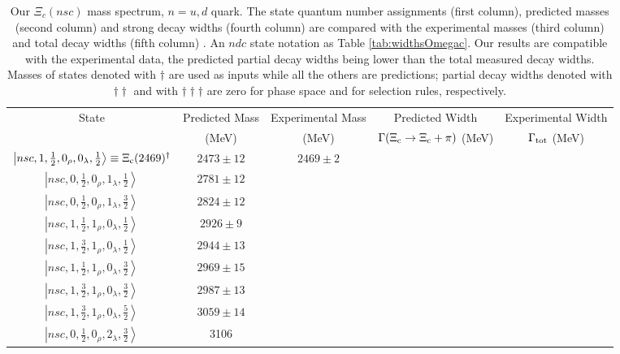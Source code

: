\documentclass[twocolumn,superscriptaddress,preprintnumbers,nofootinbib]{revtex4}
\begin{document}
\begin{table*}[htbp]
\caption{Our $\Xi_c (nsc)$ mass spectrum, $n=u,d$ quark. The  state quantum number assignments (first column), predicted masses (second column) and strong decay widths (fourth column) are compared with the  experimental  masses (third column) and total decay widths (fifth column) \cite{Aaij:2017nav,Tanabashi:2018oca}. An $ndc$ state notation as Table \ref{tab:widthsOmegac}. Our results are compatible with the experimental data, the predicted partial decay widths being lower than the total measured decay widths. Masses of states denoted  with $\dagger$ are used as inputs while all the others
are predictions; partial decay widths denoted with $\dagger  \dagger  $ and with  $\dagger  \dagger  \dagger $  are zero for phase space and for selection rules, respectively. }
\begin{tabular}{ccccc}
\hline
\hline
State & Predicted Mass & Experimental Mass & Predicted Width & Experimental Width\\
         & (MeV)                & (MeV)                      & $\Gamma(\Xi_{\rm c}
 \rightarrow \Xi_{\rm c}+\pi)$ (MeV) &  $\Gamma_{\rm tot}$  (MeV) \\
\hline
$\left| nsc,1, \frac{1}{2},0_{\rho},0_{\lambda}, \frac{1}{2} \right\rangle \equiv \Xi_{\rm c}(2469)^{\dagger}$   &  $2473 \pm 12$ & $2469\pm2$ &   &   \\
 $\left| nsc,0, \frac{1}{2},0_{\rho},1_{\lambda}, \frac{1}{2} \right\rangle  $ &  $2781 \pm 12$ &  &  &  \\
  $\left| nsc,0, \frac{1}{2},0_{\rho},1_{\lambda}, \frac{3}{2} \right\rangle $ & $ 2824\pm 12$ &  &  &  \\
$\left| nsc,1, \frac{1}{2},1_{\rho},0_{\lambda}, \frac{1}{2} \right\rangle $   &  $2926 \pm 9$ &  &  &  \\
$\left| nsc,1, \frac{3}{2},1_{\rho},0_{\lambda},  \frac{1}{2} \right\rangle $   &  $2944 \pm 13$   & &   & \\
$\left| nsc,1,  \frac{1}{2},1_{\rho},0_{\lambda}, \frac{3}{2} \right\rangle $  &  $ 2969\pm 15$ &  &    &  \\
$\left| nsc,1, \frac{3}{2},1_{\rho},0_{\lambda}, \frac{3}{2} \right\rangle  $  & $2987\pm13$ &  &  &  \\
$\left| nsc,1, \frac{3}{2},1_{\rho},0_{\lambda}, \frac{5}{2} \right\rangle $  & $ 3059\pm14$ &  & &   \\
$\left| nsc,0, \frac{1}{2},0_{\rho},2_{\lambda}, \frac{3}{2} \right\rangle  $&3106 & & &  \\

\end{tabular}
\end{table*}
\end{document}
